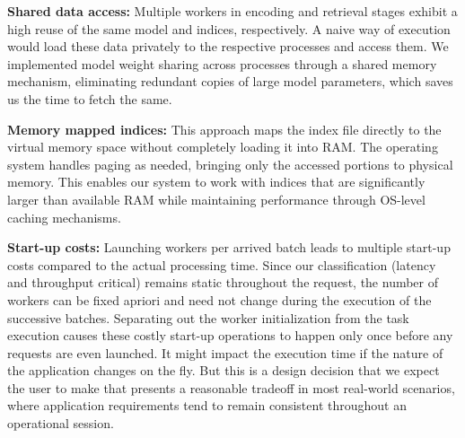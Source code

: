 \noindent\textbf{Shared data access:} Multiple workers in encoding and retrieval stages exhibit a high reuse of the same model and indices, respectively. A naive way of execution would load these data privately to the respective processes and access them. We implemented model weight sharing across processes through a shared memory mechanism, eliminating redundant copies of large model parameters, which saves us the time to fetch the same. 

\noindent\textbf{Memory mapped indices:} This approach maps the index file directly to the virtual memory space without completely loading it into RAM. The operating system handles paging as needed, bringing only the accessed portions to physical memory. This enables our system to work with indices that are significantly larger than available RAM while maintaining performance through OS-level caching mechanisms. 

\noindent\textbf{Start-up costs:} Launching workers per arrived batch leads to multiple start-up costs compared to the actual processing time. Since our classification (latency and throughput critical) remains static throughout the request, the number of workers can be fixed apriori and need not change during the execution of the successive batches. Separating out the worker initialization from the task execution causes these costly start-up operations to happen only once before any requests are even launched.  It might impact the execution time if the nature of the application changes on the fly. 
But this is a design decision that we expect the user to make that presents a reasonable tradeoff in most real-world scenarios, where application requirements tend to remain consistent throughout an operational session.


